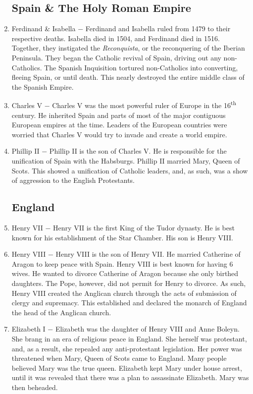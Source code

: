 \documentclass[12pt]{article}
\begin{document}
\begin{enumerate}
\subsection{Spain \& The Holy Roman Empire}

\item Ferdinand \& Isabella $-$ Ferdinand and Isabella ruled from 1479 to their respective deaths. Isabella died in 1504, and Ferdinand died in 1516. Together, they instigated the \textit{Reconquista}, or the reconquering of the Iberian Peninsula. They began the Catholic revival of Spain, driving out any non-Catholics. The Spanish Inquisition tortured non-Catholics into converting, fleeing Spain, or until death. This nearly destroyed the entire middle class of the Spanish Empire. 

\item Charles V $-$ Charles V was the most powerful ruler of Europe in the 16\textsuperscript{th} century. He inherited Spain and parts of most of the major contiguous European empires at the time. Leaders of the European countries were worried that Charles V would try to invade and create a world empire. 

\item Phillip II $-$ Phillip II is the son of Charles V. He is responsible for the unification of Spain with the Habsburgs. Phillip II married Mary, Queen of Scots. This showed a unification of Catholic leaders, and, as such, was a show of aggression to the English Protestants.

\subsection{England}

\item Henry VII $-$ Henry VII is the first King of the Tudor dynasty. He is best known for his establishment of the Star Chamber. His son is Henry VIII.

\item Henry VIII $-$ Henry VIII is the son of Henry VII. He married Catherine of Aragon to keep peace with Spain. Henry VIII is best known for having 6 wives. He wanted to divorce Catherine of Aragon because she only birthed daughters. The Pope, however, did not permit for Henry to divorce. As such, Henry VIII created the Anglican church through the acts of submission of clergy and supremacy. This established and declared the monarch of England the head of the Anglican church.

\item Elizabeth I $-$ Elizabeth was the daughter of Henry VIII and Anne Boleyn. She brang in an era of religious peace in England. She herself was protestant, and, as a result, she repealed any anti-protestant legislation. Her power was threatened when Mary, Queen of Scots came to England. Many people believed Mary was the true queen. Elizabeth kept Mary under house arrest, until it was revealed that there was a plan to assassinate Elizabeth. Mary was then beheaded.


\end{enumerate}
\end{document}

